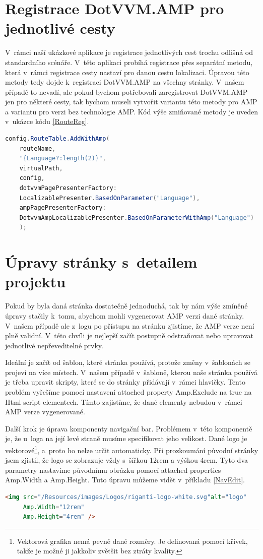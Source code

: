 \section{Registrace DotVVM.AMP pro jednotlivé cesty}
V~rámci naší ukázkové aplikace je registrace jednotlivých cest trochu odlišná od standardního scénáře. V~této aplikaci probíhá registrace přes separátní metodu, která v~rámci registrace cesty nastaví pro danou cestu lokalizaci. Úpravou této metody tedy dojde k~registraci DotVVM.AMP na všechny stránky. V~našem případě to nevadí, ale pokud bychom potřebovali zaregistrovat DotVVM.AMP jen pro některé cesty, tak bychom museli vytvořit variantu této metody pro AMP a variantu pro verzi bez technologie AMP. Kód výše zmiňované metody je uveden v~ukázce kódu \ref{RouteReg}. 
\begin{lstlisting}[language=c#, caption=Registrace cesty s~DotVVM.AMP,label=RouteReg,captionpos=t]
config.RouteTable.AddWithAmp(
	routeName,
	"{Language?:length(2)}",
	virtualPath,
	config,
	dotvvmPagePresenterFactory:
	LocalizablePresenter.BasedOnParameter("Language"),
	ampPagePresenterFactory:
	DotvvmAmpLocalizablePresenter.BasedOnParameterWithAmp("Language")
	);

\end{lstlisting}

\section{Úpravy stránky s~detailem projektu}
Pokud by byla daná stránka dostatečně jednoduchá, tak by nám výše zmíněné úpravy stačily k~tomu, abychom mohli vygenerovat AMP verzi dané stránky. V~našem případě ale z~logu po přístupu na stránku zjistíme, že AMP verze není plně validní. V~této chvíli je nejlepší začít postupně odstraňovat nebo upravovat jednotlivé nepřeveditelné prvky.

Ideální je začít od šablon, které stránka používá, protože změny v~šablonách se projeví na více místech. V~našem případě v~šabloně, kterou naše stránka používá je třeba upravit skripty, které se do stránky přidávají v~rámci hlavičky. Tento problém vyřešíme pomocí nastavení attached property Amp.Exclude na true na Html script elementech. Tímto zajistíme, že dané elementy nebudou v~rámci AMP verze vygenerované.

Další krok je úprava komponenty navigační bar. Problémem v~této komponentě je, že u~loga na její levé straně musíme specifikovat jeho velikost. Dané logo je vektorové\footnote{Vektorová grafika nemá pevně dané rozměry. Je definovaná pomocí křivek, takže je možné ji jakkoliv zvětšit bez ztráty kvality.}, a~proto ho nelze určit automaticky. Při prozkoumání původní stránky jsem zjistil, že logo se zobrazuje vždy s~šířkou 12rem a výškou 4rem. Tyto dva parametry nastavíme původnímu obrázku pomocí attached properties Amp.Width a Amp.Height. Tuto úpravu můžeme vidět v~příkladu \ref{NavEdit}.
\begin{lstlisting}[language=html, caption=Upřesnění velikosti obrázku.,label=NavEdit,captionpos=t]
<img src="/Resources/images/Logos/riganti-logo-white.svg"alt="logo"
     Amp.Width="12rem"
     Amp.Height="4rem" />
\end{lstlisting}

